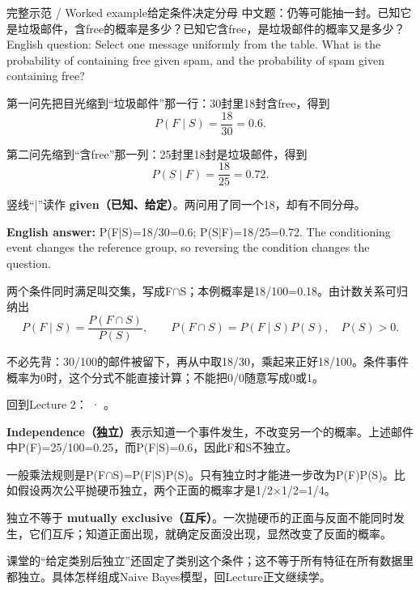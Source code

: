 \begin{StudyBlock}{完整示范 / Worked example}{给定条件决定分母}
中文题：仍等可能抽一封。已知它是垃圾邮件，含free的概率是多少？已知它含free，是垃圾邮件的概率又是多少？\\

English question: Select one message uniformly from the table. What is the probability of containing free given spam, and the probability of spam given containing free?


第一问先把目光缩到“垃圾邮件”那一行：30封里18封含free，得到
\[
P(F\mid S)=\frac{18}{30}=0.6.\tag{M.6}
\]


第二问先缩到“含free”那一列：25封里18封是垃圾邮件，得到
\[
P(S\mid F)=\frac{18}{25}=0.72.\tag{M.7}
\]


竖线“|”读作 \textbf{given（已知、给定）}。两问用了同一个18，却有不同分母。


\textbf{English answer:} P(F|S)=18/30=0.6; P(S|F)=18/25=0.72. The conditioning event changes the reference group, so reversing the condition changes the question.
\end{StudyBlock}


两个条件同时满足叫交集，写成F\ensuremath{\cap}S；本例概率是18/100=0.18。由计数关系可归纳出
\[
P(F\mid S)=\frac{P(F\cap S)}{P(S)},\qquad
P(F\cap S)=P(F\mid S)P(S),\quad P(S)>0.\tag{M.8}
\]


不必先背：30/100的邮件被留下，再从中取18/30，乘起来正好18/100。条件事件概率为0时，这个分式不能直接计算；不能把0/0随意写成0或1。


回到Lecture 2： · 。








\textbf{Independence（独立）}表示知道一个事件发生，不改变另一个的概率。上述邮件中P(F)=25/100=0.25，而P(F|S)=0.6，因此F和S不独立。


一般乘法规则是P(F\ensuremath{\cap}S)=P(F|S)P(S)。只有独立时才能进一步改为P(F)P(S)。比如假设两次公平抛硬币独立，两个正面的概率才是1/2\ensuremath{\times}1/2=1/4。


独立不等于 \textbf{mutually exclusive（互斥）}。一次抛硬币的正面与反面不能同时发生，它们互斥；知道正面出现，就确定反面没出现，显然改变了反面的概率。


课堂的“给定类别后独立”还固定了类别这个条件；这不等于所有特征在所有数据里都独立。具体怎样组成Naive Bayes模型，回Lecture正文继续学。


